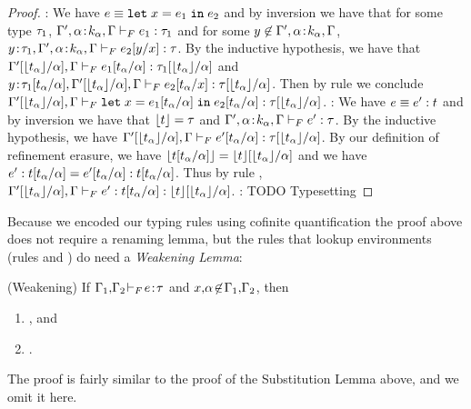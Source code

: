 \begin{proof}
\pfcase{\fLet}: We have $\sexpr \equiv \eletin{x}{\sexpr_1}{\sexpr_2}$
and by inversion we have that for some type $\sftype_1$,
$\hasftype{\tcenv', \bind{\al}{k_{\al}}, \tcenv}{\sexpr_1}{\sftype_1}$
and for some $\notmem{y}{\tcenv', \bind{\al}{k_{\al}}, \tcenv}$,
$\hasftype{\bind{y}{\sftype_1},\tcenv', \bind{\al}{k_{\al}}, \tcenv}
{\subst{\sexpr_2}{x}{y}}{\sftype}$.
By the inductive hypothesis, we have that
$\hasftype{\subst{\tcenv'}{\al}{\forgetreft{\stype_{\al}}}, \tcenv}
{\subst{\sexpr_1}{\tvar}{\stype_\tvar}}{\subst{\sftype_1}{\tvar}{\forgetreft{\stype_\tvar}}}$
and
$\hasftype{\bind{y}{\subst{\sftype_1}{\tvar}{\stype_\tvar}},\subst{\tcenv'}{\al}{\forgetreft{\stype_{\al}}}, \tcenv}
{\subst{\sexpr_2}{x}{\stype_\tvar}}{\subst{\sftype}{\tvar}{\forgetreft{\stype_\tvar}}}$.
Then by rule \fLet we conclude
$\hasftype{\subst{\tcenv'}{\al}{\forgetreft{\stype_{\al}}}, \tcenv}
{\eletin{x}{\subst{\sexpr_1}{\tvar}{\stype_\tvar}}{\subst{\sexpr_2}{\tvar}{\stype_\tvar}}}{\subst{\sftype}{\tvar}{\forgetreft{\stype_\tvar}}}$.
\pfcase{\fAnn}: We have $\sexpr \equiv \tyann{\sexpr'}{\stype}$ 
and by inversion we have that $\forgetreft{\stype} = \sftype$ and 
$\hasftype{\tcenv', \bind{\al}{k_{\al}}, \tcenv}
{\sexpr'}{\sftype}$.
By the inductive hypothesis, we have
$\hasftype{\subst{\tcenv'}{\al}{\forgetreft{\stype_{\al}}}, \tcenv}
{\subst{\sexpr'}{\tvar}{\stype_\tvar}}{\subst{\sftype}{\tvar}{\forgetreft{\stype_\tvar}}}$.
By our definition of refinement erasure, we have
$\forgetreft{\subst{\stype}{\tvar}{\stype_\tvar}}
 = \subst{\forgetreft{\stype}}{\tvar}{\forgetreft{\stype_\tvar}}$
and we have 
$\subst{\tyann{\sexpr'}{\stype}}{\tvar}{\stype_\tvar} 
 = \tyann{\subst{\sexpr'}{\tvar}{\stype_\tvar}}{\subst{\stype}{\tvar}{\stype_\tvar}}$. Thus by rule \fAnn,
$\hasftype{\subst{\tcenv'}{\al}{\forgetreft{\stype_{\al}}}, \tcenv}
{\subst{\tyann{\sexpr'}{\stype}}{\tvar}{\stype_\tvar}}{\subst{\forgetreft{\stype}}{\tvar}{\forgetreft{\stype_\tvar}}}$.
\pfcase{\fIf}: TODO Typesetting
\end{proof}  

Because we encoded our typing rules using 
cofinite quantification %
the proof above does not require a renaming lemma, but 
the rules that lookup environments 
(rules \tVar and \wtVar) do need a \emph{Weakening Lemma}:

\begin{lemma}(Weakening) \label{lem:weakeningF}
If $\hasftype{\tcenv_1,\!\tcenv_2\!}{\!\sexpr\!}{\!\sftype}$ and 
   $x,\!\al\! \not\in\! {\tcenv_1, \!\tcenv_2}$,
then 
\begin{enumerate} 
    \item 
    , and
    \item 
    .
\end{enumerate}
\end{lemma}
%
The proof is fairly similar to the proof of the Substitution Lemma above,
and we omit it here.


